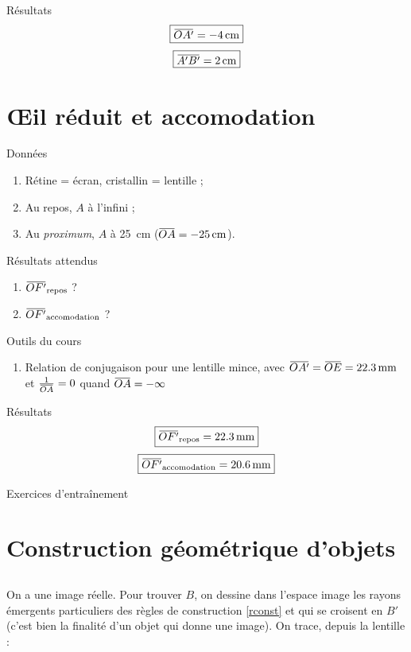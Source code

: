 \documentclass[10pt,a5paper,notitlepage]{book}
\begin{document}
\begin{NCexem}{Résultats}
    \[ \boxed{\OAp = \SI{-4}{cm}} \]
    \[ \boxed{\ABp = \SI{2}{cm}} \]
\end{NCexem}

\section{Œil réduit et accomodation}
\begin{NCdefi}{Données}
    \begin{enumerate}
        \item Rétine = écran, cristallin = lentille ;
        \item Au repos, $A$ à l'infini ;
        \item Au \textit{proximum}, $A$ à \SI{25}{cm} ($\OA = \SI{-25}{cm}$).
    \end{enumerate}
\end{NCdefi}

\begin{NCprop}{Résultats attendus}
    \begin{enumerate}
        \item $\OF \St{repos}$ ?
        \item $\OF \St{accomodation}$ ?
    \end{enumerate}
\end{NCprop}

\begin{NCdemo}{Outils du cours}
   \begin{enumerate}
       \item Relation de conjugaison pour une lentille mince, avec $\OAp =
           \obar{OE} = \SI{22.3}{mm} $ et $\frac{1}{\OA} = 0$ quand $\OA =
           -\infty$
   \end{enumerate} 
\end{NCdemo}

\begin{NCexem}{Résultats}
    \[ \boxed{\OF\St{repos} = \SI{22.3}{mm}}\]
    \[ \boxed{\OF\St{accomodation} = \SI{20.6}{mm}} \]
\end{NCexem}

\begin{center}
    \Huge Exercices d'entraînement
\end{center}

\section{Construction géométrique d'objets}
\subsection{}
On a une image réelle. Pour trouver $B$, on dessine dans l'espace image les
rayons émergents particuliers des règles de construction \ref{rconst} et qui se
croisent en $B'$ (c'est bien la finalité d'un objet qui donne une image). On
trace, depuis la lentille :
\end{document}
